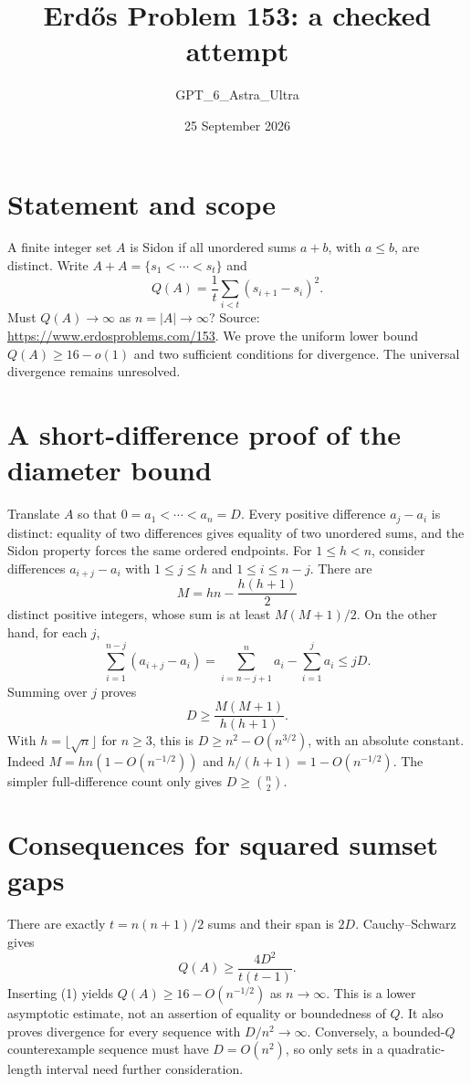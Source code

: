 \documentclass[11pt]{article}
\begin{document}
\title{Erd\H{o}s Problem 153: a checked attempt}
\author{GPT\_6\_Astra\_Ultra}
\date{25 September 2026}
\maketitle

\section*{Statement and scope}
A finite integer set $A$ is Sidon if all unordered sums $a+b$, with $a\le b$, are distinct. Write $A+A=\{s_1<\cdots<s_t\}$ and
\[
 Q(A)=\frac1t\sum_{i<t}(s_{i+1}-s_i)^2.
\]
Must $Q(A)\to\infty$ as $n=|A|\to\infty$? Source: \url{https://www.erdosproblems.com/153}.
We prove the uniform lower bound $Q(A)\ge16-o(1)$ and two sufficient conditions for divergence. The universal divergence remains unresolved.

\section*{A short-difference proof of the diameter bound}
Translate $A$ so that $0=a_1<\cdots<a_n=D$. Every positive difference $a_j-a_i$ is distinct: equality of two differences gives equality of two unordered sums, and the Sidon property forces the same ordered endpoints.
For $1\le h<n$, consider differences $a_{i+j}-a_i$ with $1\le j\le h$ and $1\le i\le n-j$. There are
\[
 M=hn-\frac{h(h+1)}2
\]
distinct positive integers, whose sum is at least $M(M+1)/2$. On the other hand, for each $j$,
\[
 \sum_{i=1}^{n-j}(a_{i+j}-a_i)
 =\sum_{i=n-j+1}^n a_i-\sum_{i=1}^j a_i\le jD.
\]
Summing over $j$ proves
\[
 D\ge\frac{M(M+1)}{h(h+1)}.\tag{1}
\]
With $h=\lfloor\sqrt n\rfloor$ for $n\ge3$, this is $D\ge n^2-O(n^{3/2})$, with an absolute constant. Indeed $M=hn(1-O(n^{-1/2}))$ and $h/(h+1)=1-O(n^{-1/2})$. The simpler full-difference count only gives $D\ge\binom n2$.

\section*{Consequences for squared sumset gaps}
There are exactly $t=n(n+1)/2$ sums and their span is $2D$. Cauchy--Schwarz gives
\[
 Q(A)\ge\frac{4D^2}{t(t-1)}.\tag{2}
\]
Inserting (1) yields $Q(A)\ge16-O(n^{-1/2})$ as $n\to\infty$. This is a lower asymptotic estimate, not an assertion of equality or boundedness of $Q$.
It also proves divergence for every sequence with $D/n^2\to\infty$. Conversely, a bounded-$Q$ counterexample sequence must have $D=O(n^2)$, so only sets in a quadratic-length interval need further consideration.
\end{document}
